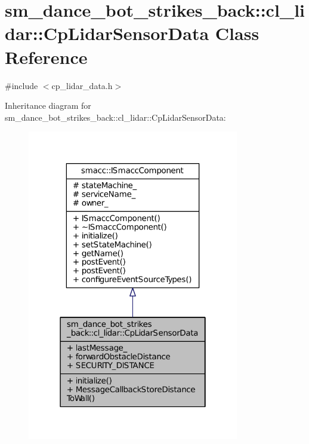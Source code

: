 \hypertarget{classsm__dance__bot__strikes__back_1_1cl__lidar_1_1CpLidarSensorData}{}\section{sm\+\_\+dance\+\_\+bot\+\_\+strikes\+\_\+back\+:\+:cl\+\_\+lidar\+:\+:Cp\+Lidar\+Sensor\+Data Class Reference}
\label{classsm__dance__bot__strikes__back_1_1cl__lidar_1_1CpLidarSensorData}


{\ttfamily \#include $<$cp\+\_\+lidar\+\_\+data.\+h$>$}



Inheritance diagram for sm\+\_\+dance\+\_\+bot\+\_\+strikes\+\_\+back\+:\+:cl\+\_\+lidar\+:\+:Cp\+Lidar\+Sensor\+Data\+:
\nopagebreak
\begin{figure}[H]
\begin{center}
\leavevmode
\includegraphics[width=262pt]{classsm__dance__bot__strikes__back_1_1cl__lidar_1_1CpLidarSensorData__inherit__graph}
\end{center}
\end{figure}


